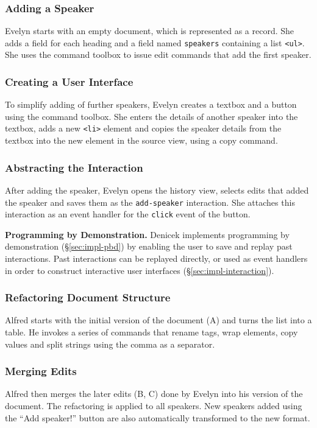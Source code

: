 \documentclass[sigconf]{acmart}
\newcommand{\diff}[1]{{#1}}
\newcommand{\note}[1]{}
\newcommand*\circled[1]{\textnormal{\footnotesize\sffamily\bfseries\protect\tikz[baseline=(char.base)]{
  \node[shape=circle,fill=black,text=white,draw,inner sep=1pt] (char) {#1};}}}
\DeclareRobustCommand{\keyideabox}[3]
{\vspace{\dimexpr\baselineskip\relax} \noindent\colorbox{gray!20}{
\parbox{\dimexpr\columnwidth-\marginparsep+1pt\relax}
{\small {#1} \textbf{#2.} #3}
}}
\begin{document}
\subsubsection*{\circled{A} Adding a Speaker}
Evelyn starts with an empty document, which is represented as a record. She adds a field for
each heading and a field named {\small\Verb_speakers_} containing a list {\small\Verb_<ul>_}. \diff{She
uses the command toolbox to issue edit commands that add the first speaker.}

\subsubsection*{\circled{B} Creating a User Interface} To simplify adding of
further speakers, Evelyn creates a textbox and a button \diff{using the command toolbox}. She enters
the details of another speaker \diff{into the textbox}, adds a new {\small\Verb_<li>_} element
and copies the speaker details from the textbox into the new element in the source view,
\diff{using a copy command}.

\subsubsection*{\circled{C} Abstracting the Interaction} After adding the speaker,
Evelyn opens the history view, selects edits that added the speaker and saves them as the
{\small\Verb_add-speaker_} interaction. She attaches this interaction as an event handler for the
{\small\Verb_click_} event of the button.

\keyideabox{\faLightbulbO}{Programming by Demonstration}{Denicek implements programming by
demonstration (\S\ref{sec:impl-pbd}) by enabling the user to save and replay past interactions.
Past interactions can be replayed directly, or used as event handlers in order to construct interactive user
interfaces (\S\ref{sec:impl-interaction}).}


\subsubsection*{\circled{D} Refactoring Document Structure} Alfred starts with the initial
version of the document (A) and turns the list into a table. He invokes a series of commands that
\diff{rename tags, wrap elements, copy values and split strings using the comma as a separator}.
\note{More concrete description of edits}

\subsubsection*{\circled{E} Merging Edits}
\diff{Alfred then merges the later edits (B, C) done by Evelyn into his version of the document.}
The refactoring is applied to all speakers. New speakers added using the ``Add speaker!''
button are also automatically transformed to the new format.
\end{document}
